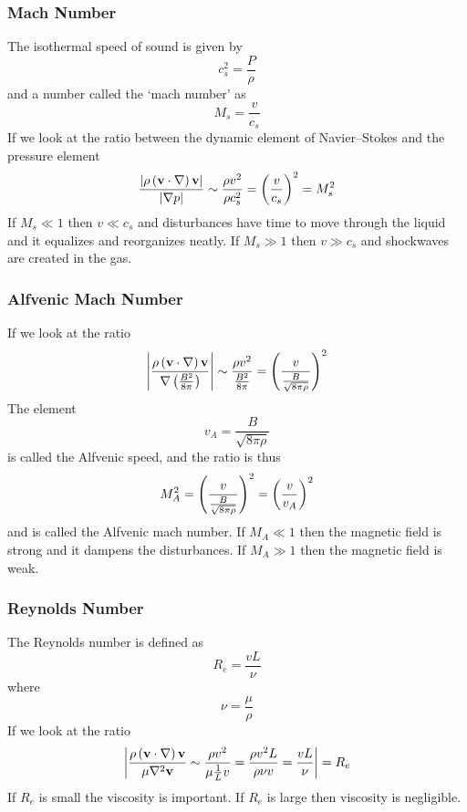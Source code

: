 \subsubsection{Mach Number}
The isothermal speed of sound is given by
\begin{equation}
    c_s^2 = \frac{P}{\rho}
\end{equation}
and a number called the `mach number' as 
\begin{equation}
    M_s = \frac{v}{c_s}
\end{equation}
If we look at the ratio between the dynamic element of Navier--Stokes and the pressure element
\begin{equation}
    \frac{\lvert\rho\left(\mathbf{v}\cdot\nabla\right)\mathbf{v}\rvert}{\lvert\nabla p\rvert} \sim \frac{\rho v^2}{\rho c_s^2} = \left(\frac{v}{c_s}\right)^2 = M_s^2
\end{equation}
If \(M_s \ll 1\) then \(v\ll c_s\) and disturbances have time to move through the liquid and it equalizes and reorganizes neatly. If \(M_s \gg 1\) then \(v \gg c_s\) and shockwaves are created in the gas.
\subsubsection{Alfvenic Mach Number}
If we look at the ratio 
\begin{equation}
    \left\lvert\frac{\rho\left(\mathbf{v}\cdot\nabla\right)\mathbf{v}}{\nabla\left(\frac{B^2}{8\pi}\right)}\right\rvert \sim \frac{\rho v^2}{\frac{B^2}{8\pi}}=\left(\frac{v}{\frac{B}{\sqrt{8\pi\rho}}}\right)^2
\end{equation}
The element
\begin{equation}
    v_A = \frac{B}{\sqrt{8\pi\rho}}
\end{equation}
is called the Alfvenic speed, and the ratio is thus
\begin{equation}
    M_A^2 = \left(\frac{v}{\frac{B}{\sqrt{8\pi\rho}}}\right)^2 = \left(\frac{v}{v_A}\right)^2
\end{equation}
and is called the Alfvenic mach number. If \(M_A \ll 1\) then the magnetic field is strong and it dampens the disturbances. If \(M_A \gg 1\) then the magnetic field is weak.
\subsubsection{Reynolds Number}
The Reynolds number is defined as
\begin{equation}
    R_e = \frac{vL}{\nu}
\end{equation}
where
\begin{equation}
    \nu = \frac{\mu}{\rho}
\end{equation}
If we look at the ratio
\begin{equation}
    \left\lvert\frac{\rho\left(\mathbf{v}\cdot\nabla\right)\mathbf{v}}{\mu\nabla^2\mathbf{v}} \sim \frac{\rho v^2}{\mu\frac{1}{L}v} = \frac{\rho v^2 L}{\rho \nu v} = \frac{vL}{\nu}\right\rvert = R_e
\end{equation}
If \(R_e\) is small the viscosity is important. If \(R_e\) is large then viscosity is negligible.
